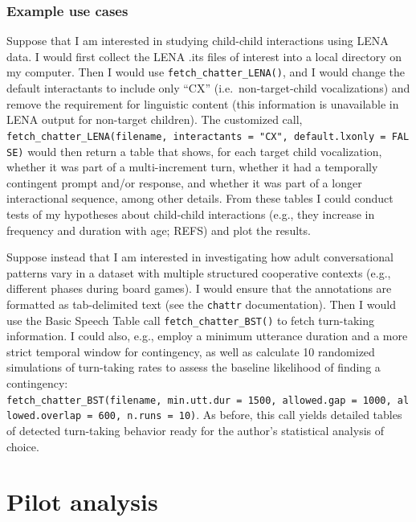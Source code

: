 \documentclass[10pt, letterpaper]{article}
\begin{document}
\hypertarget{example-use-cases}{%
\subsubsection{Example use cases}\label{example-use-cases}}

Suppose that I am interested in studying child-child interactions using
LENA data. I would first collect the LENA .its files of interest into a
local directory on my computer. Then I would use
\texttt{fetch\_chatter\_LENA()}, and I would change the default
interactants to include only ``CX'' (i.e.~non-target-child
vocalizations) and remove the requirement for linguistic content (this
information is unavailable in LENA output for non-target children). The
customized call,
\texttt{fetch\_chatter\_LENA(filename,\ interactants\ =\ "CX",\ default.lxonly\ =\ FALSE)}
would then return a table that shows, for each target child
vocalization, whether it was part of a multi-increment turn, whether it
had a temporally contingent prompt and/or response, and whether it was
part of a longer interactional sequence, among other details. From these
tables I could conduct tests of my hypotheses about child-child
interactions (e.g., they increase in frequency and duration with age;
REFS) and plot the results.

Suppose instead that I am interested in investigating how adult
conversational patterns vary in a dataset with multiple structured
cooperative contexts (e.g., different phases during board games). I
would ensure that the annotations are formatted as tab-delimited text
(see the \texttt{chattr} documentation). Then I would use the Basic
Speech Table call \texttt{fetch\_chatter\_BST()} to fetch turn-taking
information. I could also, e.g., employ a minimum utterance duration and
a more strict temporal window for contingency, as well as calculate 10
randomized simulations of turn-taking rates to assess the baseline
likelihood of finding a contingency:
\texttt{fetch\_chatter\_BST(filename,\ min.utt.dur\ =\ 1500,\ allowed.gap\ =\ 1000,\ allowed.overlap\ =\ 600,\ n.runs\ =\ 10)}.
As before, this call yields detailed tables of detected turn-taking
behavior ready for the author's statistical analysis of choice.

\hypertarget{pilot-analysis}{%
\section{Pilot analysis}\label{pilot-analysis}}
\end{document}
